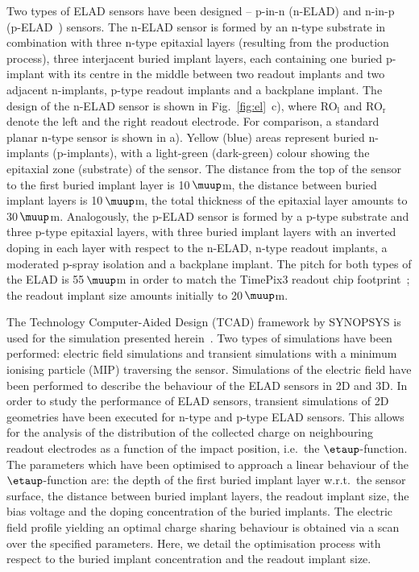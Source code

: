 \documentclass[a4paper,11pt]{article}
\begin{document}
Two types of ELAD sensors have been designed -- p-in-n (n-ELAD) and n-in-p (p-ELAD~\cite{elad}) sensors.
The n-ELAD sensor is formed by an n-type substrate in combination with three n-type epitaxial layers (resulting from the production process),
 three interjacent buried implant layers, each containing one buried p-implant with its centre in the middle between two readout implants and two adjacent n-implants,
 p-type readout implants and a backplane implant.
The design of the n-ELAD sensor is shown in Fig.~\ref{fig:el}~c), where RO$_{\textrm{l}}$ and RO$_{\textrm{r}}$ denote the left and the right readout electrode.
For comparison, a standard planar n-type sensor is shown in a).
Yellow (blue) areas represent buried n-implants (p-implants), with a light-green (dark-green) colour showing the epitaxial zone (substrate) of the sensor. 
The distance from the top of the sensor to the first buried implant layer is 10\,$\muup$m, the distance between buried implant layers is 10\,$\muup$m, the total thickness of the epitaxial layer amounts to 30\,$\muup$m.
Analogously, the p-ELAD sensor is formed by a p-type substrate and three p-type epitaxial layers,
 with three buried implant layers with an inverted doping in each layer with respect to the n-ELAD,
 n-type readout implants, a moderated p-spray isolation and a backplane implant.
The pitch for both types of the ELAD is 55\,$\muup$m in order to match the TimePix3 readout chip footprint~\cite{tp3}; the readout implant size amounts initially to 20\,$\muup$m.

The Technology Computer-Aided Design (TCAD) framework by SYNOPSYS is used for the simulation presented herein~\cite{syn}.
Two types of simulations have been performed: electric field simulations and transient simulations with a minimum ionising particle (MIP) traversing the sensor.
Simulations of the electric field have been performed to describe the behaviour of the ELAD sensors in 2D and 3D.
In order to study the performance of ELAD sensors, transient simulations of 2D geometries have been executed for n-type and p-type ELAD sensors.
This allows for the analysis of the distribution of the collected charge on neighbouring readout electrodes as a function of the impact position, i.e.\ the $\etaup$-function.
The parameters which have been optimised to approach a linear behaviour of the $\etaup$-function are: the depth of the first buried implant layer w.r.t.\ the sensor surface, the distance between buried implant layers,
 the readout implant size, the bias voltage and the doping concentration of the buried implants. 
The electric field profile yielding an optimal charge sharing behaviour is obtained via a scan over the specified parameters.
Here, we detail the optimisation process with respect to the buried implant concentration and the readout implant size.
\end{document}
